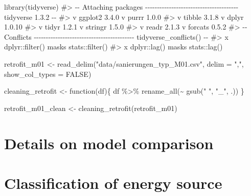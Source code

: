 \documentclass[
  letterpaper,
  DIV=11,
  numbers=noendperiod]{scrreprt}
\newenvironment{Shaded}{\begin{snugshade}}{\end{snugshade}}
\newcommand{\AttributeTok}[1]{\textcolor[rgb]{0.40,0.45,0.13}{#1}}
\newcommand{\CommentTok}[1]{\textcolor[rgb]{0.37,0.37,0.37}{#1}}
\newcommand{\ConstantTok}[1]{\textcolor[rgb]{0.56,0.35,0.01}{#1}}
\newcommand{\ControlFlowTok}[1]{\textcolor[rgb]{0.00,0.23,0.31}{#1}}
\newcommand{\FunctionTok}[1]{\textcolor[rgb]{0.28,0.35,0.67}{#1}}
\newcommand{\NormalTok}[1]{\textcolor[rgb]{0.00,0.23,0.31}{#1}}
\newcommand{\OtherTok}[1]{\textcolor[rgb]{0.00,0.23,0.31}{#1}}
\newcommand{\SpecialCharTok}[1]{\textcolor[rgb]{0.37,0.37,0.37}{#1}}
\newcommand{\StringTok}[1]{\textcolor[rgb]{0.13,0.47,0.30}{#1}}
\begin{document}
\begin{Shaded}
\begin{Highlighting}[]
\FunctionTok{library}\NormalTok{(tidyverse)}
\CommentTok{\#\textgreater{} {-}{-} Attaching packages {-}{-}{-}{-}{-}{-}{-}{-}{-}{-}{-}{-}{-}{-}{-}{-}{-}{-}{-}{-}{-}{-}{-}{-}{-}{-}{-}{-}{-}{-}{-}{-}{-}{-}{-}{-}{-}{-}{-} tidyverse 1.3.2 {-}{-}}
\CommentTok{\#\textgreater{} v ggplot2 3.4.0      v purrr   1.0.0 }
\CommentTok{\#\textgreater{} v tibble  3.1.8      v dplyr   1.0.10}
\CommentTok{\#\textgreater{} v tidyr   1.2.1      v stringr 1.5.0 }
\CommentTok{\#\textgreater{} v readr   2.1.3      v forcats 0.5.2 }
\CommentTok{\#\textgreater{} {-}{-} Conflicts {-}{-}{-}{-}{-}{-}{-}{-}{-}{-}{-}{-}{-}{-}{-}{-}{-}{-}{-}{-}{-}{-}{-}{-}{-}{-}{-}{-}{-}{-}{-}{-}{-}{-}{-}{-}{-}{-}{-}{-}{-}{-} tidyverse\_conflicts() {-}{-}}
\CommentTok{\#\textgreater{} x dplyr::filter() masks stats::filter()}
\CommentTok{\#\textgreater{} x dplyr::lag()    masks stats::lag()}

\NormalTok{retrofit\_m01 }\OtherTok{\textless{}{-}} \FunctionTok{read\_delim}\NormalTok{(}\StringTok{"data/sanierungen\_typ\_M01.csv"}\NormalTok{, }\AttributeTok{delim =} \StringTok{","}\NormalTok{, }\AttributeTok{show\_col\_types =} \ConstantTok{FALSE}\NormalTok{)}

\NormalTok{cleaning\_retrofit }\OtherTok{\textless{}{-}} \ControlFlowTok{function}\NormalTok{(df)\{}
\NormalTok{  df }\SpecialCharTok{\%\textgreater{}\%}
    \FunctionTok{rename\_all}\NormalTok{(}\SpecialCharTok{\textasciitilde{}} \FunctionTok{gsub}\NormalTok{(}\StringTok{" "}\NormalTok{, }\StringTok{"\_"}\NormalTok{, .))}
\NormalTok{\}}


\NormalTok{retrofit\_m01\_clean }\OtherTok{\textless{}{-}} \FunctionTok{cleaning\_retrofit}\NormalTok{(retrofit\_m01)}
\end{Highlighting}
\end{Shaded}

\hypertarget{details-on-model-comparison}{%
\section{Details on model
comparison}\label{details-on-model-comparison}}

\hypertarget{classification-of-energy-source}{%
\section{Classification of energy
source}\label{classification-of-energy-source}}
\end{document}
